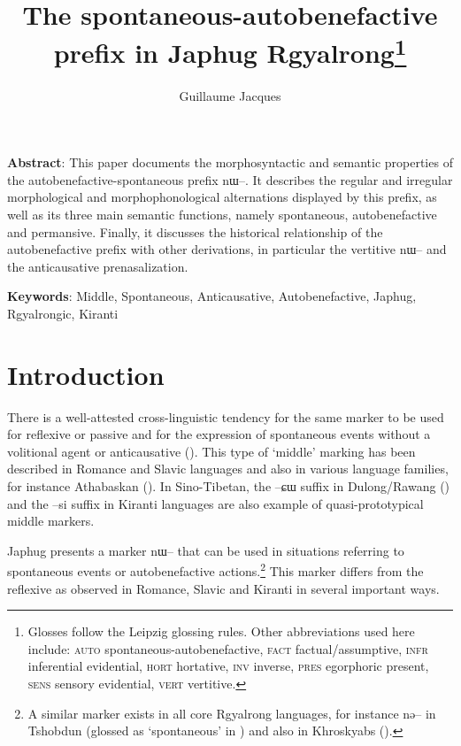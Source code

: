 \documentclass[oldfontcommands,oneside,a4paper,11pt]{article}
\newcommand{\ipa}[1]{{\phon \mbox{#1}}} %
\begin{document}
 
 \title{ The spontaneous-autobenefactive prefix in Japhug Rgyalrong\footnote{Glosses follow the Leipzig glossing rules. Other abbreviations used here include: \textsc{auto} spontaneous-autobenefactive, \textsc{fact} factual/assumptive, \textsc{infr} inferential evidential, \textsc{hort} hortative, \textsc{inv} inverse, \textsc{pres} egorphoric present, \textsc{sens} sensory  evidential, \textsc{vert} vertitive. }}
  
\author{Guillaume Jacques}
\maketitle
\linenumbers
\sloppy

\textbf{Abstract}: This paper documents the morphosyntactic and semantic properties of the autobenefactive-spontaneous prefix \ipa{nɯ--}. It describes the regular and irregular morphological and morphophonological alternations displayed by this prefix, as well as its three main semantic functions, namely spontaneous, autobenefactive and permansive. Finally, it discusses the historical relationship of the autobenefactive prefix with other derivations, in particular the vertitive \ipa{nɯ--} and the anticausative prenasalization.

\textbf{Keywords}: Middle, Spontaneous, Anticausative, Autobenefactive, Japhug, Rgyalrongic, Kiranti


\section{Introduction}
There is a well-attested cross-linguistic tendency for the same marker to be used for reflexive or passive and for the expression of spontaneous events without a volitional agent or anticausative (\citealt[142-144]{kemmer93middle}). This type of `middle' marking has been described in Romance and Slavic languages and also in various language families, for instance Athabaskan (\citealt{thompson96middle}). In Sino-Tibetan, the \ipa{--ɕɯ} suffix in Dulong/Rawang (\citealt{lapolla05reflexive}) and the \ipa{--si} suffix in Kiranti languages are also example of quasi-prototypical middle markers.

Japhug presents a marker \ipa{nɯ--} that can be used in situations referring to  spontaneous events or autobenefactive actions.\footnote{A similar marker exists in all core Rgyalrong languages, for instance \ipa{nə--} in Tshobdun (glossed as `spontaneous' in \citealt[634]{jackson14morpho}) and also in Khroskyabs (\citealt[157-160]{lai13affixale}).} This marker differs from the reflexive as observed in Romance, Slavic and Kiranti in several important ways.
\end{document}
